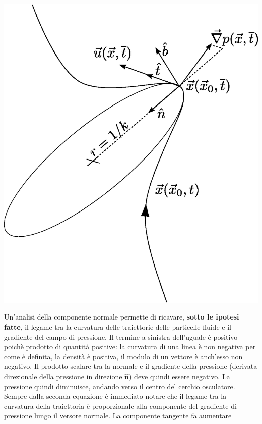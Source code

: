\hfill
\begin{minipage}{0.40\textwidth}
\begin{center}
   \includegraphics[width=1.0\textwidth]{./fig/frenet.eps}
\end{center}
\end{minipage}
%
Un'analisi della componente normale permette di ricavare, \textbf{sotto le
 ipotesi fatte}, il legame tra la curvatura delle traiettorie delle
 particelle fluide e il gradiente del campo di pressione.
Il termine a sinistra dell'uguale è positivo poichè prodotto di quantità
 positive: la curvatura di una linea è non negativa per come è definita, la
 densità è positiva, il modulo di un vettore è anch'esso non negativo.
Il prodotto scalare tra la normale e il gradiente della pressione
 (derivata direzionale della pressione in direzione $\bm{\hat{n}}$) deve
 quindi essere negativo. La pressione quindi diminuisce, andando verso
 il centro del cerchio osculatore.
Sempre dalla seconda equazione è immediato notare che il legame tra la
 curvatura della traiettoria è proporzionale alla componente del gradiente
 di pressione lungo il versore normale. La componente tangente fa aumentare 
